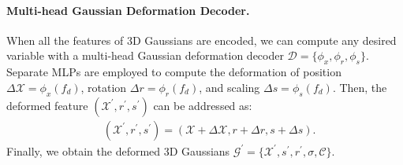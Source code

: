 
\paragraph{Multi-head Gaussian Deformation Decoder.}
\label{subsec:Gaussian Deformation Decoder}

When all the features of 3D Gaussians are encoded, we can compute any desired variable with a multi-head Gaussian deformation decoder $\mathcal{D}=\{\phi_x, \phi_r, \phi_s\}$. Separate MLPs are employed to compute the deformation of position $\Delta \mathcal{X} = \phi_x(f_d)$, rotation $\Delta r= \phi_r(f_d)$, and scaling $\Delta s=\phi_s(f_d)$.
Then, the deformed feature $(\mathcal{X}^\prime,r^\prime,s^\prime)$ can be addressed as:
\begin{align}
    & (\mathcal{X}^\prime, r^\prime, s^\prime) = (\mathcal{X} + \Delta \mathcal{X}, r + \Delta r, s + \Delta s) .
\end{align}
Finally, we obtain the deformed 3D Gaussians $\mathcal{G}^\prime=\{\mathcal{X}^\prime, s^\prime, r^\prime,\sigma,\mathcal{C} \}$.



